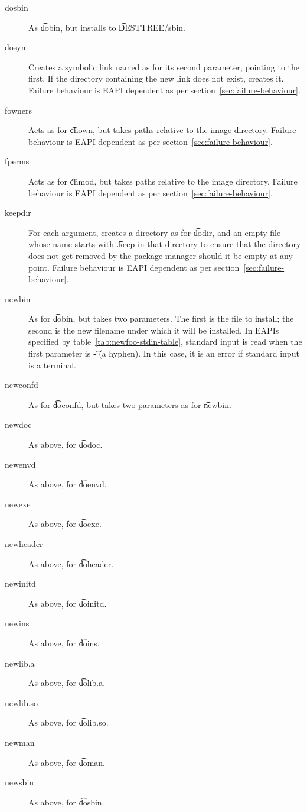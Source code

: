 \begin{description}
\item[dosbin] As \t{dobin}, but installs to \t{DESTTREE/sbin}.

\item[dosym] Creates a symbolic link named as for its second parameter, pointing to the first. If
    the directory containing the new link does not exist, creates it. Failure behaviour is EAPI
    dependent as per section~\ref{sec:failure-behaviour}.

\item[fowners] Acts as for \t{chown}, but takes paths relative to the image directory. Failure
    behaviour is EAPI dependent as per section~\ref{sec:failure-behaviour}.

\item[fperms] Acts as for \t{chmod}, but takes paths relative to the image directory. Failure
    behaviour is EAPI dependent as per section~\ref{sec:failure-behaviour}.

\item[keepdir] For each argument, creates a directory as for \t{dodir}, and an empty file whose
    name starts with \t{.keep} in that directory to ensure that the directory does not get removed
    by the package manager should it be empty at any point. Failure behaviour is EAPI dependent
    as per section~\ref{sec:failure-behaviour}.

\item[newbin]  As for \t{dobin}, but takes two parameters. The first is
    the file to install; the second is the new filename under which it will be installed. In EAPIs
    specified by table~\ref{tab:newfoo-stdin-table}, standard input is read when the first
    parameter is \t{-} (a hyphen). In this case, it is an error if standard input is a terminal.

\item[newconfd] As for \t{doconfd}, but takes two parameters as for \t{newbin}.

\item[newdoc] As above, for \t{dodoc}.

\item[newenvd] As above, for \t{doenvd}.

\item[newexe] As above, for \t{doexe}.

\item[newheader] As above, for \t{doheader}.

\item[newinitd] As above, for \t{doinitd}.

\item[newins] As above, for \t{doins}.

\item[newlib.a] As above, for \t{dolib.a}.

\item[newlib.so] As above, for \t{dolib.so}.

\item[newman] As above, for \t{doman}.

\item[newsbin] As above, for \t{dosbin}.

\end{description}

